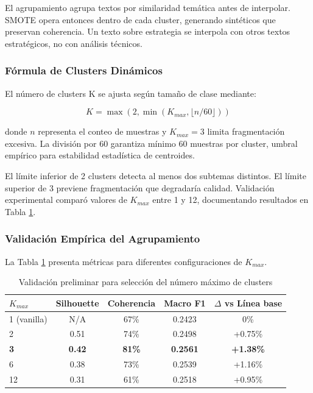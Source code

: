 El agrupamiento agrupa textos por similaridad temática antes de interpolar. SMOTE opera entonces dentro de cada cluster, generando sintéticos que preservan coherencia. Un texto sobre estrategia se interpola con otros textos estratégicos, no con análisis técnicos.

\subsubsection*{Fórmula de Clusters Dinámicos}

El número de clusters K se ajusta según tamaño de clase mediante:

\begin{equation}
K = \max(2, \min(K_{max}, \lfloor n / 60 \rfloor))
\label{eq:n_clusters}
\end{equation}

donde $n$ representa el conteo de muestras y $K_{max}=3$ limita fragmentación excesiva. La división por 60 garantiza mínimo 60 muestras por cluster, umbral empírico para estabilidad estadística de centroides.

El límite inferior de 2 clusters detecta al menos dos subtemas distintos. El límite superior de 3 previene fragmentación que degradaría calidad. Validación experimental comparó valores de $K_{max}$ entre 1 y 12, documentando resultados en Tabla \ref{tab:clustering_validation}.

\subsubsection*{Validación Empírica del Agrupamiento}

La Tabla \ref{tab:clustering_validation} presenta métricas para diferentes configuraciones de $K_{max}$.

\begin{table}[h]
\centering
\caption{Validación preliminar para selección del número máximo de clusters}
\label{tab:clustering_validation}
\begin{tabular}{lcccc}
\hline
$K_{max}$ & Silhouette & Coherencia & Macro F1 & $\Delta$ vs Línea base \\
\hline
1 (vanilla) & N/A & 67\% & 0.2423 & 0\% \\
2 & 0.51 & 74\% & 0.2498 & +0.75\% \\
\textbf{3} & \textbf{0.42} & \textbf{81\%} & \textbf{0.2561} & \textbf{+1.38\%} \\
6 & 0.38 & 73\% & 0.2539 & +1.16\% \\
12 & 0.31 & 61\% & 0.2518 & +0.95\% \\
\hline
\end{tabular}
\end{table}

